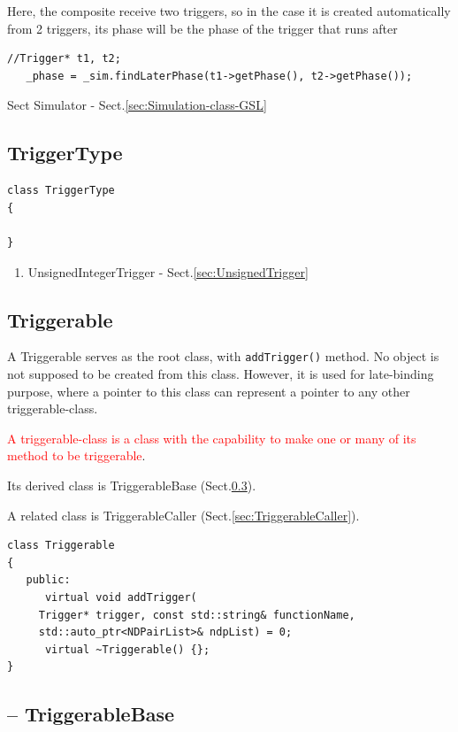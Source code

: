 Here, the composite receive two triggers, so in the case it is created
automatically from 2 triggers, its phase will be the phase of the trigger that
runs after
\begin{lstlisting}
//Trigger* t1, t2;
   _phase = _sim.findLaterPhase(t1->getPhase(), t2->getPhase());
\end{lstlisting}
Sect Simulator - Sect.\ref{sec:Simulation-class-GSL}

\subsection{TriggerType}
\label{sec:TriggerType}

\begin{verbatim}
class TriggerType
{

}
\end{verbatim}

\begin{enumerate}
  \item UnsignedIntegerTrigger - Sect.\ref{sec:UnsignedTrigger}
\end{enumerate}

\subsection{Triggerable}
\label{sec:Triggerable}

A Triggerable serves as the root class, with \verb!addTrigger()! method.
No object is not supposed to be created from this class.
However, it is used for late-binding purpose, where a pointer to this class can represent a 
pointer to any other triggerable-class.

\textcolor{red}{A triggerable-class is a class with the capability to make one
or many of its method to be triggerable}.

Its derived class is TriggerableBase (Sect.\ref{sec:TriggerableBase}).


A related class is TriggerableCaller (Sect.\ref{sec:TriggerableCaller}).


\begin{verbatim}
class Triggerable
{
   public:
      virtual void addTrigger(
	 Trigger* trigger, const std::string& functionName, 
	 std::auto_ptr<NDPairList>& ndpList) = 0;
      virtual ~Triggerable() {};
}
\end{verbatim}

\subsection{-- TriggerableBase}
\label{sec:TriggerableBase}



